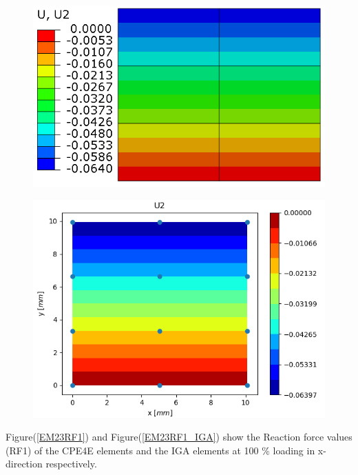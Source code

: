 \documentclass[11pt]{article}
\begin{document}
\begin{figure}[H]
	\centering
	\begin{minipage}{.5\textwidth}
		\centering
		\includegraphics[width=1\linewidth]{EM23U2.png}
		\label{EM23U2}
	\end{minipage}%
	\begin{minipage}{.5\textwidth}
		\centering
		\includegraphics[width=1\linewidth]{EM23U2_IGA.png}
		\label{EM23U2_IGA}
	\end{minipage}
\end{figure}
Figure(\ref{EM23RF1}) and Figure(\ref{EM23RF1_IGA}) show the Reaction force values (RF1) of the CPE4E elements and the IGA elements at 100 \% loading in x-direction respectively. \\
\end{document}
